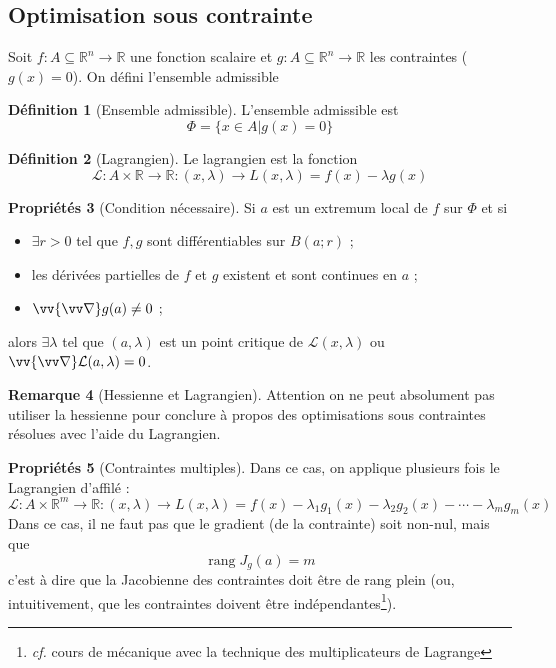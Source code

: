 \documentclass[11pt,a4paper]{article}
\theoremstyle{definition}
\newtheorem{mydef}{Définition}[section]
\newtheorem{myprop}[mydef]{Propriétés}
\newtheorem{myrem}[mydef]{Remarque}
\newcommand{\R}{\mathbb{R}}
\DeclareMathOperator{\newrang}{rang}
\let\oldnabla\nabla
\renewcommand{\nabla}{\vv{\oldnabla}}
\newcommand{\fl}{\rightarrow}
\begin{document}
\subsection{Optimisation sous contrainte}

Soit $f : A \subseteq \R^n \fl \R$ une fonction scalaire et $g : A \subseteq \R^n \fl \R$ les contraintes ($g(x) = 0$). On défini l'ensemble admissible

\begin{mydef}[Ensemble admissible] L'ensemble admissible est
\[ \Phi = \{ x \in A | g(x) = 0 \} \]
\end{mydef}

\begin{mydef}[Lagrangien] Le lagrangien est la fonction
\[ \mathcal{L} : A \times \R \fl \R : (x, \lambda) \fl L(x, \lambda) = f(x) - \lambda g(x) \]
\end{mydef}

\begin{myprop}[Condition nécessaire]
Si $a$ est un extremum local de $f$ sur $\Phi$ et si
\begin{itemize}
\item $\exists r >0$ tel que $f, g$ sont différentiables
 sur $B(a;r)$ ;
\item les dérivées partielles de $f$ et $g$ existent et sont continues en $a$ ;
\item $\nabla g(a) \neq 0$ ;
\end{itemize}
alors $\exists \lambda$ tel que $(a,\lambda)$ est un point critique de $\mathcal{L}(x,\lambda)$ ou $\nabla \mathcal{L}(a,\lambda) = 0$.
\end{myprop}

\begin{myrem}[Hessienne et Lagrangien] Attention on ne peut absolument pas utiliser la hessienne pour conclure à propos des optimisations sous contraintes résolues avec l'aide du Lagrangien. \end{myrem}

\begin{myprop}[Contraintes multiples] Dans ce cas, on applique plusieurs fois le Lagrangien d'affilé :
\[ \mathcal{L} : A \times \R^m \fl \R : (x, \lambda) \fl L(x, \lambda) = f(x) - \lambda_1 g_1(x) - \lambda_2 g_2(x) - \cdots - \lambda_m g_m(x) \]
Dans ce cas, il ne faut pas que le gradient (de la contrainte) soit non-nul, mais que
\[ \newrang J_g(a) = m \]
c'est à dire que la Jacobienne des contraintes doit être de rang plein (ou, intuitivement, que les contraintes doivent être indépendantes\footnote{\emph{cf.} cours de mécanique avec la technique des multiplicateurs de Lagrange}). \end{myprop}
\end{document}
